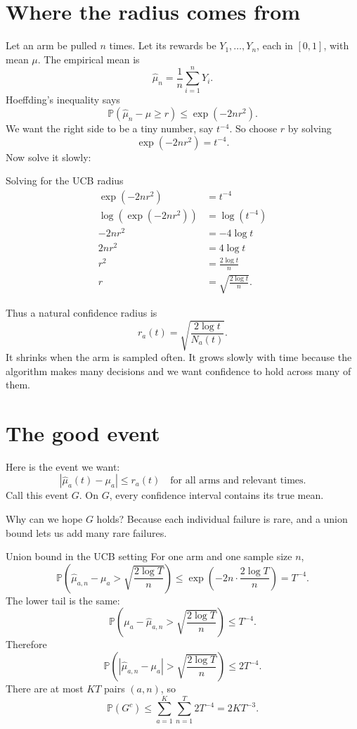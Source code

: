 \documentclass[en,nofont,11pt]{elegantbook}
\newcommand{\Pp}{\mathbb{P}}
\begin{document}
\section{Where the radius comes from}

Let an arm be pulled $n$ times. Let its rewards be $Y_1,\ldots,Y_n$, each in $[0,1]$, with mean $\mu$. The empirical mean is
\[
\widehat\mu_n=\frac{1}{n}\sum_{i=1}^n Y_i.
\]
Hoeffding's inequality says
\[
\Pp\left(\widehat\mu_n-\mu\geq r\right)
\leq
\exp(-2nr^2).
\]
We want the right side to be a tiny number, say $t^{-4}$. So choose $r$ by solving
\[
\exp(-2nr^2)=t^{-4}.
\]
Now solve it slowly:

\begin{derivationbox}{Solving for the UCB radius}
\[
\begin{aligned}
\exp(-2nr^2)&=t^{-4}\\
\log\left(\exp(-2nr^2)\right)&=\log(t^{-4})\\
-2nr^2&=-4\log t\\
2nr^2&=4\log t\\
r^2&=\frac{2\log t}{n}\\
r&=\sqrt{\frac{2\log t}{n}}.
\end{aligned}
\]
\end{derivationbox}

Thus a natural confidence radius is
\[
r_a(t)=\sqrt{\frac{2\log t}{N_a(t)}}.
\]
It shrinks when the arm is sampled often. It grows slowly with time because the algorithm makes many decisions and we want confidence to hold across many of them.

\section{The good event}

Here is the event we want:
\[
\left|\widehat\mu_a(t)-\mu_a\right|
\leq
r_a(t)
\quad\text{for all arms and relevant times.}
\]
Call this event $G$. On $G$, every confidence interval contains its true mean.

Why can we hope $G$ holds? Because each individual failure is rare, and a union bound lets us add many rare failures.

\begin{proofbox}{Union bound in the UCB setting}
For one arm and one sample size $n$,
\[
\Pp\left(\widehat\mu_{a,n}-\mu_a>\sqrt{\frac{2\log T}{n}}\right)
\leq
\exp\left(-2n\cdot\frac{2\log T}{n}\right)
=T^{-4}.
\]
The lower tail is the same:
\[
\Pp\left(\mu_a-\widehat\mu_{a,n}>\sqrt{\frac{2\log T}{n}}\right)
\leq T^{-4}.
\]
Therefore
\[
\Pp\left(\left|\widehat\mu_{a,n}-\mu_a\right|>\sqrt{\frac{2\log T}{n}}\right)
\leq 2T^{-4}.
\]
There are at most $KT$ pairs $(a,n)$, so
\[
\Pp(G^c)
\leq
\sum_{a=1}^K\sum_{n=1}^T 2T^{-4}
=2KT^{-3}.
\]
\end{proofbox}
\end{document}
